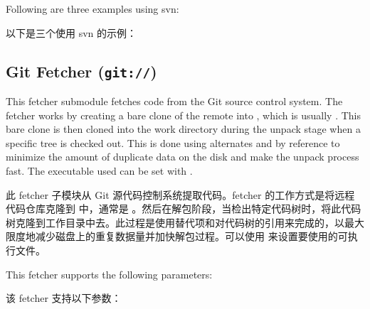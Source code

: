 \medskip
Following are three examples using svn:

以下是三个使用 svn 的示例：


\subsection{Git Fetcher (\texttt{git://})}
\label{section:Git Fetcher}

This fetcher submodule fetches code from the Git source control system. The fetcher works by creating a bare clone of the remote into , which is usually . This bare clone is then cloned into the work directory during the unpack stage when a specific tree is checked out. This is done using alternates and by reference to minimize the amount of duplicate data on the disk and make the unpack process fast. The executable used can be set with .

此 fetcher 子模块从 Git 源代码控制系统提取代码。fetcher 的工作方式是将远程代码仓库克隆到  中，通常是 。然后在解包阶段，当检出特定代码树时，将此代码树克隆到工作目录中去。此过程是使用替代项和对代码树的引用来完成的，以最大限度地减少磁盘上的重复数据量并加快解包过程。可以使用  来设置要使用的可执行文件。

This fetcher supports the following parameters:

该 fetcher 支持以下参数：

